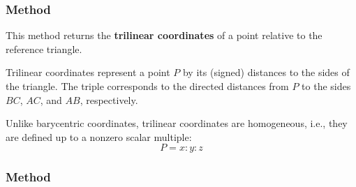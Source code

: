 \vspace{1em}
\begin{minipage}{.45\textwidth}
  \let\tul\tkzUseLua
\end{minipage}
\begin{minipage}{.55\textwidth}
\begin{tkzexample}
\end{tkzexample}
\end{minipage}


\subsubsection{Method } %
\label{ssub:triangle_trilinear_coordinates_pt}

This method returns the \textbf{trilinear coordinates} of a point relative to the reference triangle.

\medskip
\noindent
Trilinear coordinates represent a point $P$ by its (signed) distances to the sides of the triangle. The triple  corresponds to the directed distances from $P$ to the sides $BC$, $AC$, and $AB$, respectively.

\begin{mybox}
\end{mybox}

\medskip
\noindent
Unlike barycentric coordinates, trilinear coordinates are homogeneous, i.e., they are defined up to a nonzero scalar multiple:
\[
P = x : y : z
\]


\subsubsection{Method } %
\label{ssub:method_triangle_get_angle}

